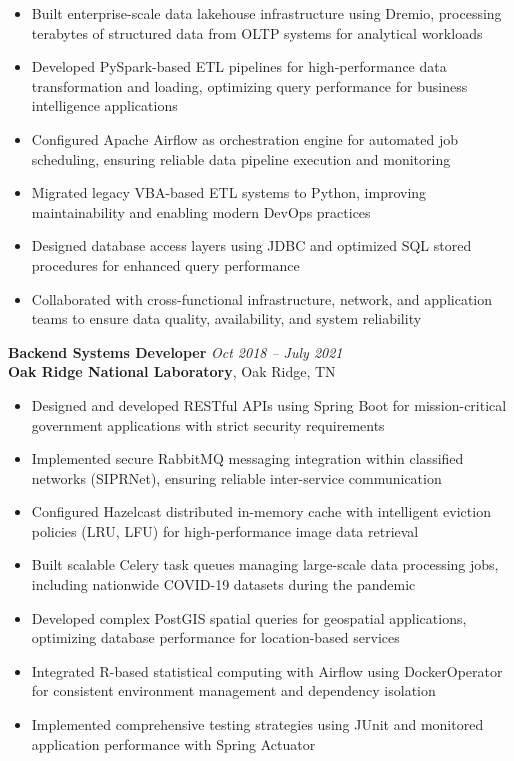 \documentclass[10pt,letterpaper]{article}
\begin{document}
\begin{itemize}
    \item Built enterprise-scale data lakehouse infrastructure using Dremio, processing terabytes of structured data from OLTP systems for analytical workloads
    \item Developed PySpark-based ETL pipelines for high-performance data transformation and loading, optimizing query performance for business intelligence applications
    \item Configured Apache Airflow as orchestration engine for automated job scheduling, ensuring reliable data pipeline execution and monitoring
    \item Migrated legacy VBA-based ETL systems to Python, improving maintainability and enabling modern DevOps practices
    \item Designed database access layers using JDBC and optimized SQL stored procedures for enhanced query performance
    \item Collaborated with cross-functional infrastructure, network, and application teams to ensure data quality, availability, and system reliability
\end{itemize}

\vspace{8pt}
\noindent\textbf{Backend Systems Developer} \hfill \textit{Oct 2018 -- July 2021} \\
\textbf{Oak Ridge National Laboratory}, Oak Ridge, TN

\begin{itemize}
    \item Designed and developed RESTful APIs using Spring Boot for mission-critical government applications with strict security requirements
    \item Implemented secure RabbitMQ messaging integration within classified networks (SIPRNet), ensuring reliable inter-service communication
    \item Configured Hazelcast distributed in-memory cache with intelligent eviction policies (LRU, LFU) for high-performance image data retrieval
    \item Built scalable Celery task queues managing large-scale data processing jobs, including nationwide COVID-19 datasets during the pandemic
    \item Developed complex PostGIS spatial queries for geospatial applications, optimizing database performance for location-based services
    \item Integrated R-based statistical computing with Airflow using DockerOperator for consistent environment management and dependency isolation
    \item Implemented comprehensive testing strategies using JUnit and monitored application performance with Spring Actuator
\end{itemize}
\end{document}
